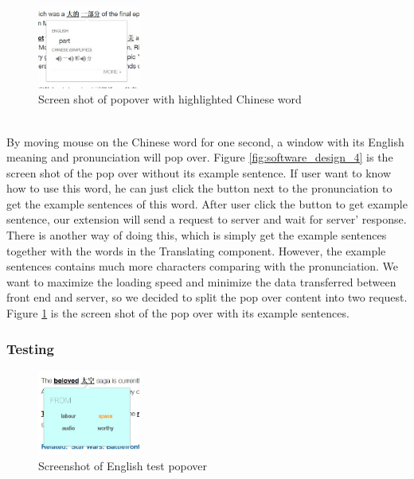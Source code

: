 \begin{figure}[ht]
    \centering
    \includegraphics[width=0.3\textwidth]{software_design_5.jpg}
    \caption{Screen shot of popover with highlighted Chinese word}
    \label{fig:software_design_5}
\end{figure}
\\
By moving mouse on the Chinese word for one second, a window with its English meaning and pronunciation will pop over. Figure \ref{fig:software_design_4} is the screen shot of the pop over without its example sentence. If user want to know how to use this word, he can just click the button next to the pronunciation to get the example sentences of this word. After user click the button to get example sentence, our extension will send a request to server and wait for server' response. There is another way of doing this, which is simply get the example sentences together with the words in the Translating component. However, the example sentences contains much more characters comparing with the pronunciation. We want to maximize the loading speed and minimize the data transferred between front end and server, so we decided to split the pop over content into two request. Figure \ref{fig:software_design_5} is the screen shot of the pop over with its example sentences.
\\
\subsubsection{Testing}
\begin{figure}[ht]
\centering
  \centering
  \includegraphics[width=0.3\textwidth]{software_design_7.jpg}
  \caption{Screenshot of English test popover}
  \label{fig:software_design_7}
\end{figure}


